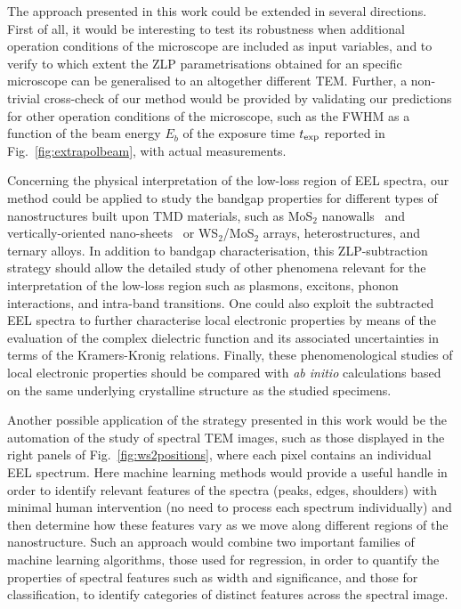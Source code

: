 The approach presented in this work could be extended
in several directions.
%
First of all, it would be interesting to test its robustness when additional
operation conditions of the microscope are included as input variables,
and to verify to which extent the ZLP parametrisations obtained for an specific microscope
can be generalised to an altogether different TEM.
%
Further, a non-trivial cross-check of our method would be provided by validating
our predictions for other operation conditions of the microscope, such
as the FWHM as a function of the beam energy $E_b$ of the exposure time
$t_{\rm exp}$ reported in Fig.~\ref{fig:extrapolbeam},
with actual measurements.

Concerning the physical interpretation of the low-loss region of EEL
spectra, our method could be applied to study the bandgap properties 
for different types
of nanostructures built upon TMD materials, such as MoS$_2$ nanowalls~\cite{nanowalls}
and 
vertically-oriented nano-sheets~\cite{D0NR00755B} or
WS$_2$/MoS$_2$ arrays, heterostructures, and ternary alloys.
%
In addition to bandgap characterisation, this ZLP-subtraction
strategy should allow the detailed study
of other phenomena relevant for the interpretation of the low-loss
region such as  plasmons, excitons, phonon interactions, and
intra-band transitions.
%
One could also exploit the subtracted EEL spectra to further characterise
local electronic properties by means of the
 evaluation of the complex dielectric function and its associated
uncertainties in terms of the Kramers-Kronig relations.
%
Finally, these phenomenological studies of local electronic properties should be compared
with {\it ab initio} calculations based
on the same underlying crystalline structure as the studied specimens.

Another possible application of the strategy presented in this work would be the automation of
the study of spectral TEM images,
such as those displayed in the right panels of Fig.~\ref{fig:ws2positions},
where each pixel contains an individual EEL spectrum.
%
Here machine learning methods would provide a  useful handle in order
to identify relevant features of the spectra (peaks, edges, shoulders) with minimal
human intervention (no need to process each spectrum individually) and then determine
how these features vary as we move along different regions of the
nanostructure.
%
Such an approach would combine two important families of machine learning algorithms,
those used for regression, in order to quantify the properties of spectral
features such as width and significance, and those for classification, to identify categories
of distinct features across the spectral image.

